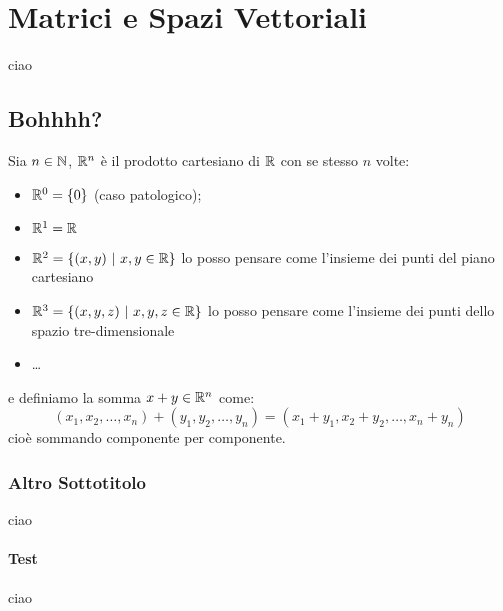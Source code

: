 \chapter{Matrici e Spazi Vettoriali}
		
		ciao
		
		\section{Bohhhh?}
			Sia $n\in\mathbb{N}$, $\mathbb{R}^n$ è il prodotto cartesiano di $\mathbb{R}$ con se stesso $n$ volte:
			\begin{itemize} 
				\item $\mathbb{R}^0=\{0\}$ (caso patologico);
				\item $\mathbb{R}^1=\mathbb{R}$
				\item $\mathbb{R}^2=\{(x,y)\ \rvert\  x,y\in\mathbb{R}\}$ lo posso pensare come l'insieme dei punti del piano cartesiano
				\item $\mathbb{R}^3=\{(x,y,z)\ \rvert\  x,y,z\in\mathbb{R}\}$ lo posso pensare come l'insieme dei punti dello spazio tre-dimensionale
				\item \ldots
			\end{itemize}
			e definiamo la somma $x+y\in\mathbb{R}^n$ come: $$(x_1,x_2,\ldots,x_n)+(y_1,y_2,\ldots,y_n)=(x_1+y_1,x_2+y_2,\ldots,x_n+y_n)$$ cioè sommando componente per componente.
		
			\subsection{Altro Sottotitolo}
			
				ciao
			
				\subsubsection{Test}
				
					ciao
	